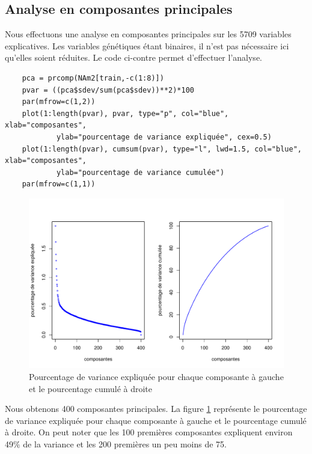 \documentclass[12pt,a4paper]{article}
\begin{document}
\subsection{Analyse en composantes principales}
Nous effectuons une analyse en composantes principales sur les 5709 variables explicatives. Les variables génétiques étant binaires, il n'est pas nécessaire ici qu'elles soient réduites. Le code ci-contre permet d'effectuer l'analyse.
\begin{lstlisting}
	pca = prcomp(NAm2[train,-c(1:8)])
	pvar = ((pca$sdev/sum(pca$sdev))**2)*100
	par(mfrow=c(1,2))
	plot(1:length(pvar), pvar, type="p", col="blue", xlab="composantes",
			ylab="pourcentage de variance expliquée", cex=0.5)
	plot(1:length(pvar), cumsum(pvar), type="l", lwd=1.5, col="blue", xlab="composantes",
			ylab="pourcentage de variance cumulée")
	par(mfrow=c(1,1))
\end{lstlisting}
\begin{figure}[h!]
	\begin{center}
		\includegraphics[scale=0.7]{figures/pca_plot.pdf}
		\caption{Pourcentage de variance expliquée pour chaque composante à gauche et le pourcentage cumulé à droite}
		\label{fig:acp_plot}
	\end{center}
\end{figure}
Nous obtenons 400 composantes principales. La figure \ref{fig:acp_plot}
représente le pourcentage de variance expliquée pour chaque composante à gauche
et le pourcentage cumulé à droite. On peut noter que les 100 premières
composantes expliquent environ 49\% de la variance et les 200 premières un peu
moins de 75.  
\end{document}
